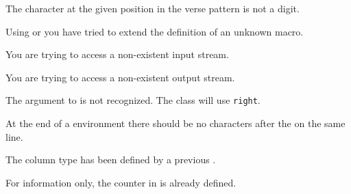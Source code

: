 \begin{plainlist}


\item[]

    The character at the given position in the verse pattern is not a digit.

\item[]

    Using \cmd{\addtodef} or \cmd{\addtoiargdef} you have tried to extend 
the definition of an unknown macro.

\item[]

    You are trying to access a non-existent input stream.

\item[]

    You are trying to access a non-existent output stream.

\item[]

   The argument to  is not recognized. The class
will use \texttt{right}.


\item[]

    At the end of a  environment there should be no characters
after the  on the same line. 

\item[]

    The column type has been defined by a previous \cmd{\newcolumntype}.


\item[]

    For information only, the counter in \cmd{\providecounter} 
is already defined.


\end{plainlist}
